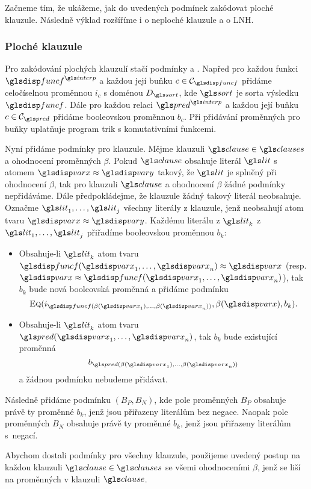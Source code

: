 {Začneme tím, že ukážeme, jak do uvedených podmínek zakódovat
ploché klauzule. Následně výklad rozšíříme i o neploché klauzule
a o LNH.

\subsubsection{Ploché klauzule}

Pro zakódování plochých klauzulí stačí podmínky \Eq{} a \Clause{}.
Napřed pro každou funkci $\func^\interp$ a každou její buňku
$c \in \cells_\func$ přidáme celočíselnou proměnnou $i_c$
s doménou $D_\sort$, kde $\sort$ je sorta výsledku $\func$.
Dále pro každou relaci $\pred^\interp$ a každou její buňku
$c \in \cells_\pred$ přidáme booleovskou proměnnou $b_c$.
Při přidávání proměnných pro buňky uplatňuje program \crossbow{}
trik s komutativními funkcemi.

Nyní přidáme podmínky pro klauzule. Mějme klauzuli
$\clause \in \clauses$ a ohodnocení proměnných $\beta$.
Pokud $\clause$ obsahuje literál $\lit$ s atomem $\var \approx \varY$
takový, že $\lit$ je splněný při ohodnocení $\beta$, tak
pro klauzuli $\clause$ a ohodnocení $\beta$ žádné podmínky nepřidáváme.
Dále předpokládejme, že klauzule žádný takový literál neobsahuje.
Označme $\lit_1 \comdots \lit_j$ všechny literály z klauzule,
jenž neobsahují atom tvaru $\var \approx \varY$.
Každému literálu z $\lit_k$ z $\lit_1 \comdots \lit_j$
přiřadíme booleovskou proměnnou $b_k$:
\begin{itemize}
\item Obsahuje-li $\lit_k$ atom tvaru
  $\func(\var_1 \comdots \var_n) \approx \var$ (resp.
  $\var \approx \func(\var_1 \comdots \var_n)$),
  tak $b_k$ bude nová booleovská proměnná
  a přidáme podmínku
  \[
    \Eq(i_{\func(\beta(\var_1) \comdots \beta(\var_n))}, \beta(\var), b_k).
  \]
\item Obsahuje-li $\lit_k$ atom tvaru
  $\pred(\var_1 \comdots \var_n)$, tak $b_k$ bude existující proměnná
  \[
    b_{\pred(\beta(\var_1) \comdots \beta(\var_n))}
  \]
  a žádnou podmínku nebudeme přidávat.
\end{itemize}
Následně přidáme podmínku \Clause$(B_P, B_N)$, kde pole
proměnných $B_P$ obsahuje právě ty proměnné
$b_k$, jenž jsou přiřazeny literálům bez negace.
Naopak pole proměnných $B_N$ obsahuje právě ty proměnné $b_k$,
jenž jsou přiřazeny literálům s~negací.

Abychom dostali podmínky pro všechny klauzule,
použijeme uvedený postup na každou klauzuli $\clause \in \clauses$
se všemi ohodnoceními $\beta$, jenž se liší na proměnných
v klauzuli $\clause$.

}
